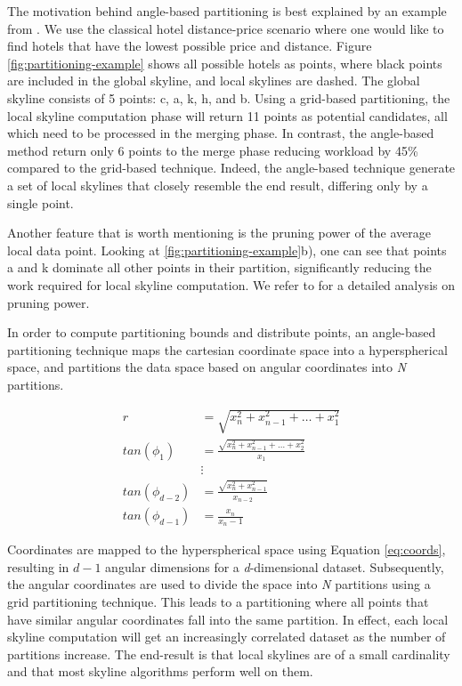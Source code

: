 \documentclass[12pt,a4paper,twoside]{report}
\begin{document}
The motivation behind angle-based partitioning is best explained
by an example from \cite{vlachou2008angle}. We use the classical
hotel distance-price scenario where one would like to find hotels
that have the lowest possible price and distance. Figure
\ref{fig:partitioning-example} shows all possible hotels as
points, where black points are included in the global skyline, and
local skylines are dashed. The global skyline consists of 5
points: c, a, k, h, and b. Using a grid-based partitioning, the
local skyline computation phase will return 11 points as potential
candidates, all which need to be processed in the merging phase.
In contrast, the angle-based method return only 6 points to the
merge phase reducing workload by 45\% compared to the grid-based
technique. Indeed, the angle-based technique generate a set of
local skylines that closely resemble the end result, differing
only by a single point.

Another feature that is worth mentioning is the pruning power of
the average local data point. Looking at
\ref{fig:partitioning-example}b), one can see that points a and k
dominate all other points in their partition, significantly
reducing the work required for local skyline computation. We refer
to \cite{vlachou2008angle} for a detailed analysis on pruning
power.

In order to compute partitioning bounds and distribute points, an
angle-based partitioning technique maps the cartesian coordinate
space into a hyperspherical space, and partitions the data space
based on angular coordinates into \textit{N} partitions.

\begin{minipage}{\linewidth}
\begin{equation}
\begin{aligned}
	 r &= \sqrt{x_n^2 + x_{n-1}^2+\ldots+x_1^2} \\
	 tan(\phi_1) &= \frac{\sqrt{x_n^2+x_{n-1}^2+\ldots+x_2^2}}{x_1} \\ 
	 &\vdots \label{eq:coords}\\
	 tan(\phi_{d-2}) &= \frac{\sqrt{x_n^2+x_{n-1}^2}}{x_{n-2}} \\
	 tan(\phi_{d-1}) &= \frac{x_n}{x_n-1}
\end{aligned}
\end{equation}
\end{minipage}

Coordinates are mapped to the hyperspherical space using Equation
\ref{eq:coords}, resulting in $d-1$ angular dimensions for a
\textit{d}-dimensional dataset. Subsequently, the angular
coordinates are used to divide the space into \textit{N}
partitions using a grid partitioning technique. This leads to a
partitioning where all points that have similar angular
coordinates fall into the same partition. In effect, each local
skyline computation will get an increasingly correlated dataset
as the number of partitions increase. The end-result is that local
skylines are of a small cardinality and that most skyline
algorithms perform well on them.
\end{document}
